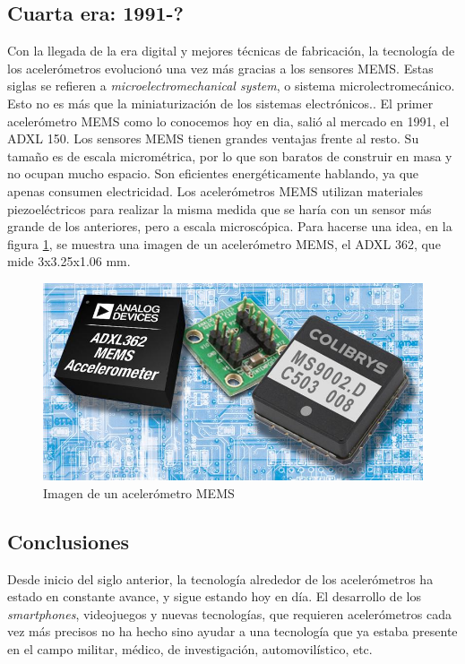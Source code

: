 \documentclass[12pt]{book}
\numberwithin{equation}{section}
\begin{document}
\subsection{Cuarta era: 1991-?}

Con la llegada de la era digital y mejores técnicas de fabricación, la tecnología de los acelerómetros evolucionó una vez más gracias a los sensores MEMS. Estas siglas se refieren a \textit{microelectromechanical system}, o sistema microlectromecánico. Esto no es más que la miniaturización de los sistemas electrónicos.. El primer acelerómetro MEMS como lo conocemos hoy en dia, salió al mercado en 1991, el ADXL 150. Los sensores MEMS tienen grandes ventajas frente al resto. Su tamaño es de escala micrométrica, por lo que son baratos de construir en masa y no ocupan mucho espacio. Son eficientes energéticamente hablando, ya que apenas consumen electricidad. Los acelerómetros MEMS utilizan materiales piezoeléctricos para realizar la misma medida que se haría con un sensor más grande de los anteriores, pero a escala microscópica. Para hacerse una idea, en la figura \ref{fig:acelerometro}, se muestra una imagen de un acelerómetro MEMS, el ADXL 362, que mide 3x3.25x1.06 mm.

\begin{figure}[h]
    \centering
    \includegraphics[width=1\textwidth]{MEMSpromo.jpg}
    \caption{Imagen de un acelerómetro MEMS}
    \label{fig:acelerometro}
\end{figure}

\subsection{Conclusiones}

Desde inicio del siglo anterior, la tecnología alrededor de los acelerómetros ha estado en constante avance, y sigue estando hoy en día. El desarrollo de los \textit{smartphones}, videojuegos y nuevas tecnologías, que requieren acelerómetros cada vez más precisos no ha hecho sino ayudar a una tecnología que ya estaba presente en el campo militar, médico, de investigación, automovilístico, etc. 
\end{document}
